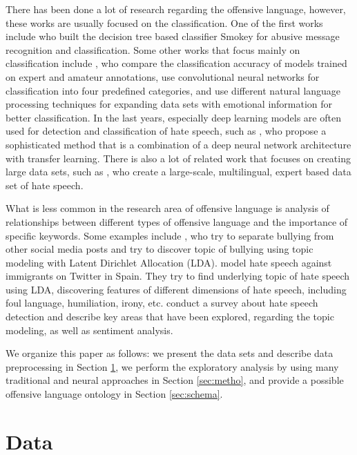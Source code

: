 \documentclass[fleqn,moreauthors,10pt]{ds_report}
\begin{document}
There has been done a lot of research regarding the offensive language, however, these works are usually focused on the classification. One of the first works include \cite{spertus1997smokey} who built the decision tree based classifier Smokey for abusive message recognition and classification. Some other works that focus mainly on classification include \cite{waseem2016you}, who compare the classification accuracy of models trained on expert and amateur annotations, \cite{gamback2017using} use convolutional neural networks for classification into four predefined categories, and \cite{martins2018hate} use different natural language processing techniques for expanding data sets with emotional information for better classification. In the last years, especially deep learning models are often used for detection and classification of hate speech, such as \cite{rizoiu2019transfer}, who propose a sophisticated method that is a combination of a deep neural network architecture with transfer learning.
There is also a lot of related work that focuses on creating large data sets, such as \cite{chung2019conan}, who create a large-scale, multilingual, expert based data set of hate speech. 

What is less common in the research area of offensive language is analysis of relationships between different types of offensive language and the importance of specific keywords. Some examples include \cite{xu2012learning}, who try to separate bullying from other social media posts and try to discover topic of bullying using topic modeling with Latent Dirichlet Allocation (LDA). \cite{calderon2020topic} model hate speech against immigrants on Twitter in Spain. They try to find underlying topic of hate speech using LDA, discovering features of different dimensions of hate speech, including foul language, humiliation, irony, etc. \cite{schmidt2017survey} conduct a survey about hate speech detection and describe key areas that have been explored, regarding the topic modeling, as well as sentiment analysis.

We organize this paper as follows: we present the data sets and describe data preprocessing in Section \ref{sec:data}, we perform the exploratory analysis by using many traditional and neural approaches in Section \ref{sec:metho}, and provide a possible offensive language ontology in Section \ref{sec:schema}.

\section{Data}
\label{sec:data}
\end{document}
